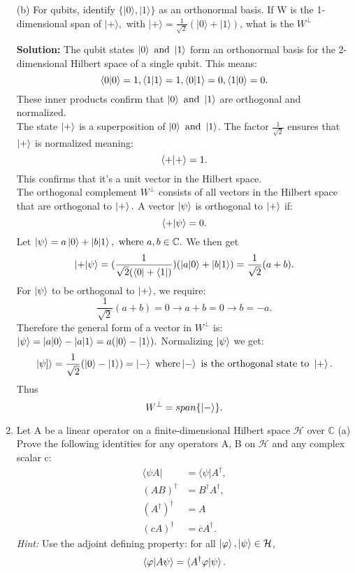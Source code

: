 \documentclass{article}
\renewcommand{\phi}{\varphi}
\theoremstyle{plain}
\numberwithin{thm}{section}
\theoremstyle{definition}
\begin{document}
\begin{enumerate}
    (b) For qubits, identify $\{|0 \rangle, |1 \rangle\}$ as an orthonormal basis. If W is the 1-dimensional span of $|+ \rangle,$ with $|+ \rangle =\frac{1}{\sqrt{2}}(|0 \rangle + |1 \rangle)$, what is the $W^\perp$

     \textbf{Solution:} The qubit states $\ket{0} \text{ and } \ket{1}$ form an orthonormal basis for the 2-dimensional Hilbert space of a single qubit. This means: $$\braket{0|0}=1, \braket{1|1}=1, \braket{0|1}=0, \braket{1|0}=0.$$ These inner products confirm that $\ket{0} \text{ and } \ket{1}$ are orthogonal and normalized. \\
     The state $\ket{+}$ is a superposition of $\ket{0} \text{ and } \ket{1}$. The factor $\frac{1}{\sqrt{2}}$ ensures that $\ket{+}$ is normalized meaning: $$\braket{+|+}=1.$$ This confirms that it's a unit vector in the Hilbert space.\\
     
     The orthogonal complement $W^\perp$ consists of all vectors in the Hilbert space that are orthogonal to $\ket{+}.$ A vector $\ket{\psi}$ is orthogonal to $\ket{+}$ if: $$\braket{+|\psi}=0.$$ Let $\ket{\psi}=a\ket{0}+\ket{b|1},\text{ where } a, b \in \mathbb{C}.$ We then get $$\ket{+|\psi}=(\frac{1}{\sqrt{2}(\bra{0}+\bra{1})})(\ket{a|0}+\ket{b|1})=\frac{1}{\sqrt{2}}(a+b).$$ For $\ket{\psi}$ to be orthogonal to $\ket{+}$, we require: $$\frac{1}{\sqrt{2}}(a+b)=0 \rightarrow a+b=0 \rightarrow b=-a.$$ Therefore the general form of a vector in $W^\perp$ is: $\ket{\psi}=\ket{a|0}-\ket{a|1}=a(\ket{0}-\ket{1}).$ Normalizing $\ket{\psi}$ we get: $$\ket{\psi]}=\frac{1}{\sqrt{2}}(\ket{0}-\ket{1})=\ket{-} \text{ where} \ket{-} \text{ is the orthogonal state to } \ket{+}.$$ Thus $$W^\perp=span\{\ket{-}\}.$$

    \item Let A be a linear operator on a finite-dimensional Hilbert space $\mathcal{H}$ over $\mathbb{C}$
    (a) Prove the following identities for any operators A, B on $\mathcal{H}$ and any complex scalar c:
    \begin{align*}
    \langle \psi A| &= \langle \psi|A^\dagger,\\
    (AB)^\dagger &= B^\dagger A^\dagger,\\
    (A^\dagger)^\dagger &=A\\
    (cA)^\dagger &= \overline{c}A^\dagger.
    \end{align*}
    \textit{Hint:} Use the adjoint defining property: for all $\ket{\phi},\ket{\psi} \in \mathcal{H}$, $$\braket{\phi|A \psi}=\braket{A^\dagger \phi|\psi}.$$


\end{enumerate}
\end{document}
